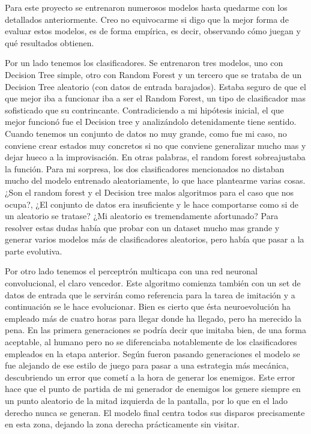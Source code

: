 
Para este proyecto se entrenaron numerosos modelos hasta quedarme con los detallados anteriormente. Creo no equivocarme si digo que la mejor forma de evaluar estos modelos, es de forma empírica, es decir, observando cómo juegan y qué resultados obtienen.

Por un lado tenemos los clasificadores. Se entrenaron tres modelos, uno con Decision Tree simple, otro con Random Forest y un tercero que se trataba de un Decision Tree aleatorio (con datos de entrada barajados). Estaba seguro de que el que mejor iba a funcionar iba a ser el Random Forest, un tipo de clasificador mas sofisticado que su contrincante. Contradiciendo a mi hipótesis inicial, el que mejor funcionó fue el Decision tree y analizándolo detenidamente tiene sentido. Cuando tenemos un conjunto de datos no muy grande, como fue mi caso, no conviene crear estados muy concretos si no que conviene generalizar mucho mas y dejar hueco a la improvisación. En otras palabras, el random forest sobreajustaba la función. Para mi sorpresa, los dos clasificadores mencionados no distaban mucho del modelo entrenado aleatoriamente, lo que hace plantearme varias cosas. ¿Son el random forest y el Decision tree malos algoritmos para el caso que nos ocupa?, ¿El conjunto de datos era insuficiente y le hace comportarse como si de un aleatorio se tratase? ¿Mi aleatorio es tremendamente afortunado? Para resolver estas dudas había que probar con un dataset mucho mas grande y generar varios modelos más de clasificadores aleatorios, pero había que pasar a la parte evolutiva.


Por otro lado tenemos el perceptrón multicapa con una red neuronal convolucional, el claro vencedor. Este algoritmo comienza también con un set de datos de entrada que le servirán como referencia para la tarea de imitación y a continuación se le hace evolucionar. Bien es cierto que ésta neuroevolución ha empleado más de cuatro horas para llegar donde ha llegado, pero ha merecido la pena. En las primera generaciones se podría decir que imitaba bien, de una forma aceptable, al humano pero no se diferenciaba notablemente de los clasificadores empleados en la etapa anterior. Según fueron pasando generaciones el modelo se fue alejando de ese estilo de juego para pasar a una estrategia más mecánica, descubriendo un error que cometí a la hora de generar los enemigos. Este error hace que el punto de partida de mi generador de enemigos los genere siempre en un punto aleatorio de la mitad izquierda de la pantalla, por lo que en el lado derecho nunca se generan. El modelo final centra todos sus disparos precisamente en esta zona, dejando la zona derecha prácticamente sin visitar. 


